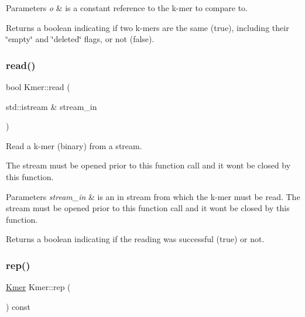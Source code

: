 \begin{DoxyParams}{Parameters}
{\em o} & is a constant reference to the k-\/mer to compare to. \\
\hline
\end{DoxyParams}
\begin{DoxyReturn}{Returns}
a boolean indicating if two k-\/mers are the same (true), including their \char`\"{}empty\char`\"{} and \char`\"{}deleted\char`\"{} flags, or not (false). 
\end{DoxyReturn}
\mbox{\label{classKmer_ad7e63cd4337067ac247a52f4b8235204}} 
\subsubsection{\texorpdfstring{read()}{read()}}
{\footnotesize\ttfamily bool Kmer\+::read (\begin{DoxyParamCaption}\item[{std\+::istream \&}]{stream\+\_\+in }\end{DoxyParamCaption})}



Read a k-\/mer (binary) from a stream. 

The stream must be opened prior to this function call and it won\textquotesingle{}t be closed by this function. 
\begin{DoxyParams}{Parameters}
{\em stream\+\_\+in} & is an in stream from which the k-\/mer must be read. The stream must be opened prior to this function call and it won\textquotesingle{}t be closed by this function. \\
\hline
\end{DoxyParams}
\begin{DoxyReturn}{Returns}
a boolean indicating if the reading was successful (true) or not. 
\end{DoxyReturn}
\mbox{\label{classKmer_a2b86fe792388a910a073d9fc4a811779}} 
\subsubsection{\texorpdfstring{rep()}{rep()}}
{\footnotesize\ttfamily \hyperlink{classKmer}{Kmer} Kmer\+::rep (\begin{DoxyParamCaption}{ }\end{DoxyParamCaption}) const}



